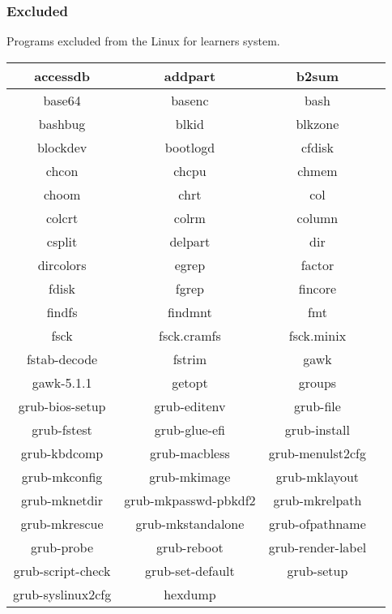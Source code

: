 \newpage

\subsubsection{Excluded}

Programs excluded from the Linux for learners system.

\begin{center}
    \begin{tabular}{|c|c|c|c|}
        \hline
        accessdb & addpart & b2sum \\
        \hline
        base64 & basenc & bash \\
        \hline
        bashbug & blkid & blkzone \\
        \hline
        blockdev & bootlogd & cfdisk \\
        \hline
        chcon & chcpu & chmem \\
        \hline
        choom & chrt & col \\
        \hline
        colcrt & colrm & column \\
        \hline
        csplit & delpart & dir \\
        \hline
        dircolors & egrep & factor \\
        \hline
        fdisk & fgrep & fincore \\
        \hline
        findfs & findmnt & fmt \\
        \hline
        fsck & fsck.cramfs & fsck.minix \\
        \hline
        fstab-decode & fstrim & gawk \\
        \hline
        gawk-5.1.1 & getopt & groups \\
        \hline
        grub-bios-setup & grub-editenv & grub-file \\
        \hline
        grub-fstest & grub-glue-efi & grub-install \\
        \hline
        grub-kbdcomp & grub-macbless & grub-menulst2cfg \\
        \hline
        grub-mkconfig & grub-mkimage & grub-mklayout \\
        \hline
        grub-mknetdir & grub-mkpasswd-pbkdf2 & grub-mkrelpath \\
        \hline
        grub-mkrescue & grub-mkstandalone & grub-ofpathname \\
        \hline
        grub-probe & grub-reboot & grub-render-label \\
        \hline
        grub-script-check & grub-set-default & grub-setup \\
        \hline
        grub-syslinux2cfg & hexdump \\
        \cline{1-2}
    \end{tabular}
\end{center}

